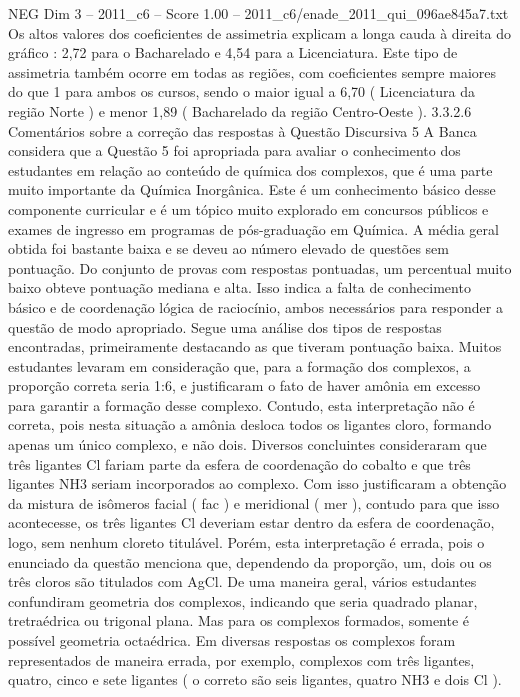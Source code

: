 \begin{textsample}{NEG Dim 3 – 2011\_c6 – Score 1.00 – 2011\_c6/enade\_2011\_qui\_096ae845a7.txt}
Os altos valores dos coeficientes de assimetria explicam a longa cauda à direita do gráfico : 2,72 para o Bacharelado e 4,54 para a Licenciatura.
Este tipo de assimetria também ocorre em todas as regiões, com coeficientes sempre maiores do que 1 para ambos os cursos, sendo o maior igual a 6,70 ( Licenciatura da região Norte ) e menor 1,89 ( Bacharelado da região Centro-Oeste ). 3.3.2.6 Comentários sobre a correção das respostas à Questão Discursiva 5 A Banca considera que a Questão 5 foi apropriada para avaliar o conhecimento dos estudantes em relação ao conteúdo de química dos complexos, que é uma parte muito importante da Química Inorgânica.
Este é um conhecimento básico desse componente curricular e é um tópico muito explorado em concursos públicos e exames de ingresso em programas de pós-graduação em Química.
A média geral obtida foi bastante baixa e se deveu ao número elevado de questões sem pontuação.
Do conjunto de provas com respostas pontuadas, um percentual muito baixo obteve pontuação mediana e alta.
Isso indica a falta de conhecimento básico e de coordenação lógica de raciocínio, ambos necessários para responder a questão de modo apropriado.
Segue uma análise dos tipos de respostas encontradas, primeiramente destacando as que tiveram pontuação baixa.
Muitos estudantes levaram em consideração que, para a formação dos complexos, a proporção correta seria 1:6, e justificaram o fato de haver amônia em excesso para garantir a formação desse complexo.
Contudo, esta interpretação não é correta, pois nesta situação a amônia desloca todos os ligantes cloro, formando apenas um único complexo, e não dois.
Diversos concluintes consideraram que três ligantes Cl fariam parte da esfera de coordenação do cobalto e que três ligantes NH3 seriam incorporados ao complexo.
Com isso justificaram a obtenção da mistura de isômeros facial ( fac ) e meridional ( mer ), contudo para que isso acontecesse, os três ligantes Cl deveriam estar dentro da esfera de coordenação, logo, sem nenhum cloreto titulável.
Porém, esta interpretação é errada, pois o enunciado da questão menciona que, dependendo da proporção, um, dois ou os três cloros são titulados com AgCl.
De uma maneira geral, vários estudantes confundiram geometria dos complexos, indicando que seria quadrado planar, tretraédrica ou trigonal plana.
Mas para os complexos formados, somente é possível geometria octaédrica.
Em diversas respostas os complexos foram representados de maneira errada, por exemplo, complexos com três ligantes, quatro, cinco e sete ligantes ( o correto são seis ligantes, quatro NH3 e dois Cl ).

\end{textsample}
